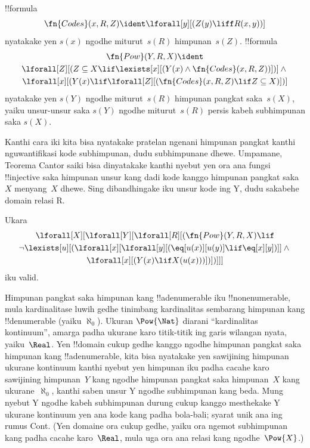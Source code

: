 \documentclass[../../../include/open-logic-section]{subfiles}
\begin{document}
\begin{prop}
!!{formula}
  \[
  \fn{Codes}(x, R, Z) \ident \lforall[y][(Z(y) \liff
    R(x, y))]
  \]
nyatakake yen $s(x)$ ngodhe miturut~$s(R)$
himpunan~$s(Z)$. !!{formula}
\begin{multline*}
  \fn{Pow}(Y, R, X) \ident \\
  \lforall[Z][(Z \subseteq X \lif \lexists[x][(Y(x) \land
    \fn{Codes}(x, R, Z))])] \land {} \\
  \lforall[x][(Y(x) \lif
    \lforall[Z][(\fn{Codes}(x, R, Z) \lif Z \subseteq X)])]
\end{multline*}
nyatakake yen $s(Y)$ ngodhe miturut~$s(R)$
himpunan pangkat saka~$s(X)$, yaiku
unsur-unsur saka $s(Y)$ ngodhe miturut~$s(R)$ persis
kabeh subhimpunan saka $s(X)$.
\end{prop}

\begin{explain}
Kanthi cara iki kita bisa nyatakake pratelan ngenani
himpunan pangkat kanthi nguwantifikasi kode
subhimpunan, dudu subhimpunane dhewe. Umpamane,
Teorema Cantor saiki bisa dinyatakake kanthi nyebut
yen ora ana fungsi !!{injective} saka himpunan
unsur kang dadi kode kanggo himpunan pangkat
saka~$X$ menyang~$X$ dhewe. Sing dibandhingake iku unsur kode ing Y, dudu sakabehe domain relasi R.
\end{explain}

\begin{prop}
Ukara
\begin{multline*}
  \lforall[X][\lforall[Y][\lforall[R][(\fn{Pow}(Y, R, X) \lif \\
      \lnot \lexists[u][(\lforall[x][\lforall[y][(\eq[u(x)][u(y)] \lif
            \eq[x][y])]] \land {}\\
        \lforall[x][(Y(x) \lif X(u(x)))])])]]]
\end{multline*}
iku valid.
\end{prop}

\begin{explain}
Himpunan pangkat saka himpunan kang !!a{denumerable}
iku !!{nonenumerable}, mula kardinalitase luwih
gedhe tinimbang kardinalitas sembarang himpunan kang
!!{denumerable} (yaiku $\aleph_0$). Ukuran
$\Pow{\Nat}$ diarani ``kardinalitas kontinuum'',
amarga padha ukurane karo titik-titik ing garis
wilangan nyata, yaiku~$\Real$. Yen !!{domain}
cukup gedhe kanggo ngodhe himpunan pangkat
saka himpunan kang !!a{denumerable}, kita bisa
nyatakake yen sawijining himpunan ukurane
kontinuum kanthi nyebut yen himpunan iku
padha cacahe karo sawijining himpunan~$Y$
kang ngodhe himpunan pangkat saka himpunan~$X$
kang ukurane~$\aleph_0$, kanthi saben unsur Y ngodhe subhimpunan kang beda. Mung nyebut Y ngodhe kabeh subhimpunan durung cukup kanggo mesthekake Y ukurane kontinuum yen ana kode kang padha bola-bali; syarat unik ana ing rumus Cont. (Yen domaine ora
cukup gedhe, yaiku ora ngemot subhimpunan
kang padha cacahe karo~$\Real$, mula uga
ora ana relasi kang ngodhe~$\Pow{X}$.)
\end{explain}
\end{document}
